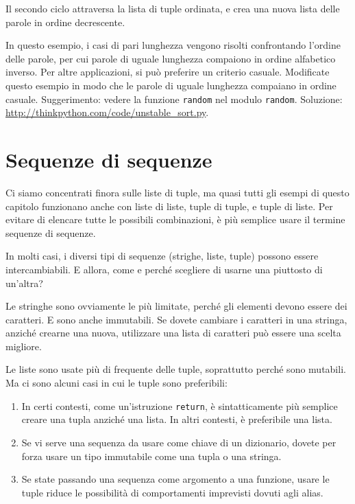 \documentclass[10pt]{book}
\begin{document}
Il secondo ciclo attraversa la lista di tuple ordinata, e crea una nuova lista delle parole in ordine decrescente.

\vspace{0.2in}
\begin{exercise}

In questo esempio, i casi di pari lunghezza vengono risolti confrontando l'ordine delle parole, per cui parole di uguale lunghezza compaiono in ordine alfabetico inverso. Per altre applicazioni, si può preferire un criterio casuale. Modificate questo esempio in modo che le parole di uguale lunghezza compaiano in ordine casuale. Suggerimento: vedere la funzione {\tt random} nel modulo {\tt random}.
Soluzione: \url{http://thinkpython.com/code/unstable_sort.py}.


\end{exercise}


\section{Sequenze di sequenze}

Ci siamo concentrati finora sulle liste di tuple, ma quasi tutti gli esempi di questo capitolo funzionano anche con liste di liste, tuple di tuple, e tuple di liste. Per evitare di elencare tutte le possibili combinazioni, è più semplice usare il termine sequenze di sequenze.

In molti casi, i diversi tipi di sequenze (strighe, liste, tuple) possono essere intercambiabili. E allora, come e perché scegliere di usarne una piuttosto di un'altra?

Le stringhe sono ovviamente le più limitate, perché gli elementi devono essere dei caratteri. E sono anche immutabili. Se dovete cambiare i caratteri in una stringa, anziché crearne una nuova, utilizzare una lista di caratteri può essere una scelta migliore.

Le liste sono usate più di frequente delle tuple, soprattutto perché sono mutabili. Ma ci sono alcuni casi in cui le tuple sono preferibili:

\begin{enumerate}

\item In certi contesti, come un'istruzione {\tt return}, è sintatticamente più semplice creare una tupla anziché una lista. In altri contesti, è preferibile una lista.

\item Se vi serve una sequenza da usare come chiave di un dizionario, dovete per forza usare un tipo immutabile come una tupla o una stringa.

\item Se state passando una sequenza come argomento a una funzione, usare le tuple riduce le possibilità di comportamenti imprevisti dovuti agli alias.

\end{enumerate}
\end{document}
